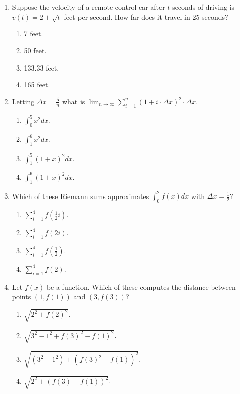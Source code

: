 \documentclass{article}
\begin{document}
\begin{enumerate}


  \item Suppose the velocity of a remote control car after $t$ seconds of driving is $v(t)=2+\sqrt{t}$ feet per second.  How far does it travel in 25 seconds?
  \begin{enumerate}
    \item 7 feet.
    \item 50 feet.
    \item 133.33 feet. %
    \item 165 feet.
  \end{enumerate}

  
  \item Letting $\Delta x=\frac{5}{n}$ what is $\displaystyle \lim_{n\to \infty} \sum_{i=1}^n \left(1+i\cdot \Delta x\right)^2\cdot\Delta x$.
  \begin{enumerate}
    \item $\displaystyle \int_0^5 x^2 dx$.
    \item $\displaystyle \int_1^6 x^2 dx$.  %
    \item $\displaystyle \int_1^5 (1+x)^2 dx$.    
    \item $\displaystyle \int_1^6 (1+x)^2 dx$.
  \end{enumerate}
  
  \item Which of these Riemann sums approximates $\int_0^2 f(x) dx$ with $\Delta x=\frac{1}{2}$?
  \begin{enumerate}
    \item $\sum_{i=1}^4 f\left(\frac{1}{2}i\right)$. %
    \item $\sum_{i=1}^4 f(2i)$.
    \item $\sum_{i=1}^4 f\left(\frac{1}{2}\right)$.
    \item $\sum_{i=1}^4 f(2)$.
  \end{enumerate}
  
  \item Let $f(x)$ be a function. Which of these computes the distance between points $(1, f(1))$ and $(3, f(3))$?
  \begin{enumerate}
    \item $\sqrt{2^2+f(2)^2}$.
    \item $\sqrt{3^2-1^2+f(3)^2-f(1)^2}$.
    \item $\sqrt{(3^2-1^2)+(f(3)^2-f(1))^2}$.
    \item $\sqrt{2^2+(f(3)-f(1))^2}$.%
    

\end{enumerate}
\end{enumerate}
\end{document}
